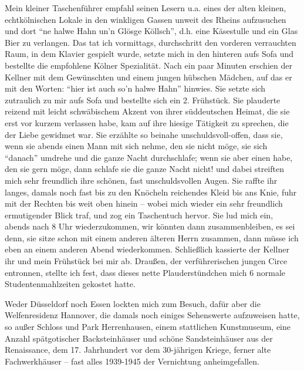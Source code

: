 Mein kleiner Taschenführer empfahl seinen Lesern u.a. eines der alten kleinen, echtkölnischen Lokale in den winkligen Gassen unweit des Rheins aufzusuchen und dort \enquote{ne halwe Hahn un'n Glösge Köllsch}, d.h. eine Käsestulle und ein Glas Bier zu verlangen. Das tat ich vormittags, durchschritt den vorderen verrauchten Raum, in dem Klavier gespielt wurde, setzte mich in den hinteren aufs Sofa und bestellte die empfohlene Kölner Spezialität. Nach ein paar Minuten erschien der Kellner mit dem Gewünschten und einem jungen hübschen Mädchen, auf das er mit den Worten: \enquote{hier ist auch so'n halwe Hahn} hinwies. Sie setzte sich zutraulich zu mir aufs Sofa und bestellte sich ein 2. Frühstück. Sie plauderte reizend mit leicht schwäbischem Akzent von ihrer süddeutschen Heimat, die sie erst vor kurzem verlassen habe, kam auf ihre hiesige Tätigkeit zu sprechen, die der Liebe gewidmet war. Sie erzählte so beinahe unschuldsvoll-offen, dass sie, wenn sie abends einen Mann mit sich nehme, den sie nicht möge, sie sich \enquote{danach} umdrehe und die ganze Nacht durchschlafe; wenn sie aber einen habe, den sie gern möge, dann schlafe sie die ganze Nacht nicht! und dabei streiften mich sehr freundlich ihre schönen, fast unschuldsvollen Augen. Sie raffte ihr langes, damals noch fast bis zu den Knöcheln reichendes Kleid bis ans Knie, fuhr mit der Rechten bis weit oben hinein -- wobei mich wieder ein sehr freundlich ermutigender Blick traf, und zog ein Taschentuch hervor. Sie lud mich ein, abends nach 8 Uhr wiederzukommen, wir könnten dann zusammenbleiben, es sei denn, sie sitze schon mit einem anderen älteren Herrn zusammen, dann müsse ich eben an einem anderen Abend wiederkommen. Schließlich kassierte der Kellner ihr und mein Frühstück bei mir ab. Draußen, der verführerischen jungen Circe entronnen, stellte ich fest, dass dieses nette Plauderstündchen mich 6 normale Studentenmahlzeiten gekostet hatte.

Weder Düsseldorf noch Essen lockten mich zum Besuch, dafür aber die Welfenresidenz Hannover, die damals noch einiges Sehenswerte aufzuweisen hatte, so außer Schloss und Park Herrenhausen, einem stattlichen Kunstmuseum, eine Anzahl spätgotischer Backsteinhäuser und schöne Sandsteinhäuser aus der Renaissance, dem 17. Jahrhundert vor dem 30-jährigen Kriege, ferner alte Fachwerkhäuser -- fast alles 1939-1945 der Vernichtung anheimgefallen.

